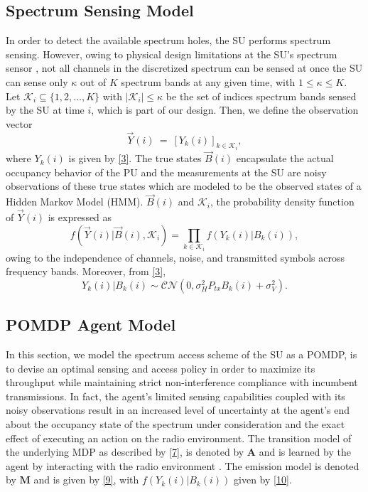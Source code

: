\documentclass[10pt,twocolumn]{IEEEtran}
\newcommand{\sst}[1]{}
\newcommand{\nm}[1]{}
\newcommand{\add}[1]{{\color{red}{#1}}}
\begin{document}
\subsection{Spectrum Sensing Model}
In order to detect the available spectrum holes, the SU performs spectrum sensing. However, owing to physical design limitations at the SU's spectrum sensor \cite{5990482}, not all channels in the discretized spectrum can be sensed at once\add{, so that}\sst{. Therefore, due to limited sensing capabilities,} the SU can sense only $\kappa$ out of $K$ spectrum bands at any given time, with $1\leq \kappa\leq K$. Let $\mathcal K_{i}\subseteq\{1,2,\dots,K\}$ with $|\mathcal K_i|\leq \kappa$ be the set of indices \add{of}\sst{ corresponding to the} spectrum bands sensed by the SU at time $i$, which is part of our design.
Then, we define the observation vector
\begin{equation}\label{8}
    \vec{Y}(i)\ =\ [Y_k(i)]_{k\in\mathcal K_i},
\end{equation}
where $Y_k(i)$ is given by \eqref{3}.
The true states $\vec{B}(i)$ encapsulate the actual occupancy behavior of the PU and the measurements at the SU are noisy observations of these true states which are modeled to be the observed states of a Hidden Markov Model (HMM). 
\add{Conditional on}\sst{Given the spectrum occupancy vector} $\vec{B}(i)$ and\sst{ the set of sensed spectrum bands} $\mathcal K_i$, the probability density function of $\vec{Y}(i)$ is expressed as
\begin{equation}\label{9}
    f(\vec{Y}(i)|\vec{B}(i),\mathcal K_i)=\prod_{k\in\mathcal K_i}f(Y_k(i)|B_k(i)),
\end{equation}
owing to the independence of channels, noise, and transmitted symbols across frequency bands. Moreover, from \eqref{3},\sst{ we find that}
\begin{equation}\label{10}
 Y_k(i)|B_k(i)\sim \mathcal{CN}(0,\sigma_H^2P_{tx}B_k(i)+\sigma_V^2).
\end{equation}
\subsection{POMDP Agent Model}
In this section, we model the spectrum access scheme of the SU as a\sst{ Partially Observable Markov Decision Process} POMDP, \add{whose goal}\sst{ wherein the goal of the POMDP agent} is to devise an optimal sensing and access policy in order to maximize its throughput while maintaining strict non-interference compliance with incumbent transmissions. In fact, the agent's limited sensing capabilities coupled with its noisy observations result in an increased level of uncertainty at the agent's end about the occupancy state of the spectrum under consideration and the exact effect of executing an action on the radio environment. The transition model of the underlying MDP as described by \eqref{7}, is denoted by $\mathbf{A}$ and is learned by the agent by interacting with the radio environment \add{(see Sec. \nm{})}. The emission model is denoted by $\mathbf{M}$ and is given by \eqref{9}, with $f(Y_k(i)|B_k(i))$ given by \eqref{10}. 
\end{document}
